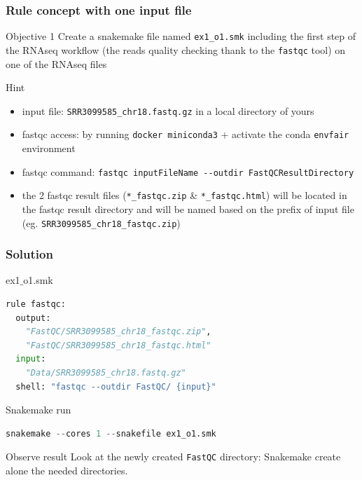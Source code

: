 \begin{frame}[containsverbatim]
\frametitle{Rule concept with one input file}
\begin{exampleblock}{Objective 1}
Create a snakemake file named \verb|ex1_o1.smk| including the first step of the RNAseq workflow (the reads quality checking thank to the \verb|fastqc| tool) on one of the RNAseq files
\end{exampleblock}
\begin{exampleblock}{Hint}
\begin{itemize}
    \item input file: \verb|SRR3099585_chr18.fastq.gz| in a local directory of yours
    \item fastqc access: by running \verb|docker miniconda3| + activate the conda \verb|envfair| environment
    \item fastqc command: \verb|fastqc inputFileName --outdir FastQCResultDirectory|
    \item the 2 fastqc result files (\verb|*_fastqc.zip| \& \verb|*_fastqc.html|) will be located in the fastqc result directory and will be named based on the prefix of input file (eg. \verb|SRR3099585_chr18_fastqc.zip|)
\end{itemize}
\end{exampleblock}
\end{frame}
\begin{frame}[containsverbatim]
\frametitle{Solution}
\begin{exampleblock}{ex1$\_$o1.smk}
\begin{lstlisting}[language=python]
rule fastqc:
  output:
    "FastQC/SRR3099585_chr18_fastqc.zip", 
    "FastQC/SRR3099585_chr18_fastqc.html"
  input:
    "Data/SRR3099585_chr18.fastq.gz"
  shell: "fastqc --outdir FastQC/ {input}"
\end{lstlisting}
\end{exampleblock}
\begin{exampleblock}{Snakemake run}
\begin{lstlisting}[language=python]
snakemake --cores 1 --snakefile ex1_o1.smk
\end{lstlisting}
\end{exampleblock}
\begin{exampleblock}{Observe result}
Look at the newly created \verb|FastQC| directory: Snakemake create alone the needed directories.
\end{exampleblock}
\end{frame}

